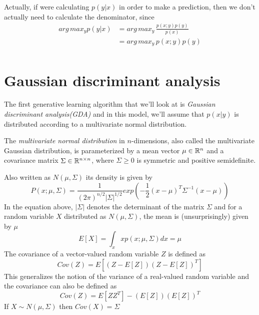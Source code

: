 Actually, if were calculating $p(y | x)$ in order to make a prediction, then we don’t actually need to 
calculate the denominator, since 
\begin{align*}
 arg \, max_y p(y | x) & = arg \, max_y \, \frac{p(x; y)p(y)}{p(x)} \\
                      & = arg \, max_y \, p(x;y)p(y) \\
\end{align*}

\section{Gaussian discriminant analysis}
The first generative learning algorithm that we’ll look at is \emph{Gaussian discriminant analysis(GDA)} and 
in this model, we’ll assume that $p(x | y)$ is distributed according to a multivariate normal distribution.

The \emph{multivariate normal distribution} in $n$-dimensions, also called the multivariate Gaussian distribution,
is parameterized by a mean vector $\mu \in \mathbb{R} ^ n$ and a covariance matrix $\Sigma \in \mathbb{R} ^ {n \times n}$,
where $\Sigma \geq 0$ is symmetric and positive semidefinite.

Also written as $N(\mu, \Sigma)$ its density is given by
\[ P(x; \mu, \Sigma) = \frac{1}{(2\pi)^{n/2} |\Sigma|^{1/2}} exp(- \frac{1}{2}(x - \mu)^T \Sigma ^{-1} (x -\mu)) \]
In the equation above, $|\Sigma|$ denotes the determinant of the matrix $\Sigma$ and for a random variable
$X$ distributed as $N(\mu, \Sigma)$, the mean is (unsurprisingly) given by $\mu$
\[ E[X] = \int _x x  p(x; \mu, \Sigma) dx= \mu \]
The covariance of a vector-valued random variable $Z$ is defined as 
\[ Cov(Z) = E[(Z - E[Z])(Z - E[Z])^T] \]
This generalizes the notion of the variance of a real-valued random variable 
and the covariance can also be defined as 
\[ Cov(Z) = E[ZZ^T] - (E[Z])(E[Z])^T \]
If $X \sim N(\mu, \Sigma)$ then $Cov(X) =  \Sigma$ 


